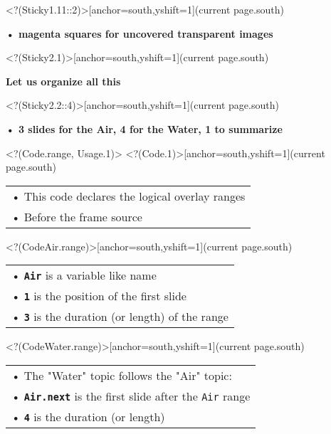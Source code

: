 \Sticky<?(Sticky1.11::2)>[anchor=south,yshift=1\baselineskip](current page.south){\begin{minipage}{0.85\textwidth}{\bfseries%
• magenta squares for uncovered transparent images
}\end{minipage}}%
\Sticky<?(Sticky2.1)>[anchor=south,yshift=1\baselineskip](current page.south){\begin{minipage}{0.75\textwidth}{\bfseries%
Let us organize all this
}\end{minipage}}%
\Sticky<?(Sticky2.2::4)>[anchor=south,yshift=1\baselineskip](current page.south){\begin{minipage}{0.85\textwidth}{\bfseries%
• 3 slides for the Air, 4 for the Water, 1 to summarize
}\end{minipage}}%
\visible<?(Code.range, Usage.1)> {%
}%
%
\Sticky<?(Code.1)>[anchor=south,yshift=1\baselineskip](current page.south){\bfseries\begin{tabular}{p{}}
• This code declares the logical overlay ranges\\
• Before the frame source
\end{tabular}}%
\Sticky<?(CodeAir.range)>[anchor=south,yshift=1\baselineskip](current page.south){\bfseries\begin{tabular}{p{}}
• \texttt{\bfseries{Air}} is a variable like name\\
• \texttt{\bfseries{1}} is the position of the first slide\\
• \texttt{\bfseries{3}} is the duration (or length) of the range
\end{tabular}}%
\Sticky<?(CodeWater.range)>[anchor=south,yshift=1\baselineskip](current page.south){\bfseries\begin{tabular}{p{}}
• The "Water" topic follows the "Air" topic:\\
• \texttt{\bfseries{Air.next}} is the first slide after the \texttt{Air} range\\
• \texttt{\bfseries{4}} is the duration (or length)
\end{tabular}}%
